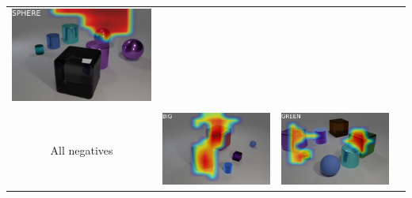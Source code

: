 \begin{table}
\begin{tabular}{@{}cccc@{}}
\begin{minipage}{.2\textwidth}
      \includegraphics[width=\linewidth]{figures/CLEVR_activations/sphere_normal.jpg}
    \end{minipage}
\\ \\
All negatives &
    \begin{minipage}{.2\textwidth}
      \includegraphics[width=\linewidth]{figures/CLEVR_activations/big_negimage01.jpg}
    \end{minipage}
    &
    \begin{minipage}{.2\textwidth}
      \includegraphics[width=\linewidth]{figures/CLEVR_activations/green_negimage01.jpg}

\end{minipage}
\end{tabular}
\end{table}
